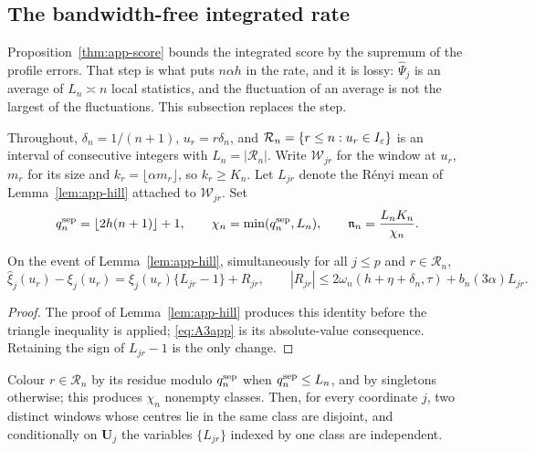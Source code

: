 \subsection{The bandwidth-free integrated rate}\label{app:colour}

Proposition~\ref{thm:app-score} bounds the integrated score by the
supremum of the profile errors.  That step is what puts $n\alpha h$ in
the rate, and it is lossy: $\widehat\Psi_j$ is an average of $L_n\asymp n$
local statistics, and the fluctuation of an average is not the largest
of the fluctuations.  This subsection replaces the step.

Throughout, $\delta_n=1/(n+1)$, $u_r=r\delta_n$, and
$\mathcal R_n=\{r\le n:u_r\in I_\varepsilon\}$ is an interval of consecutive
integers with $L_n=|\mathcal R_n|$.  Write $\mathcal W_{jr}$ for the
window at $u_r$, $m_r$ for its size and $k_r=\lfloor\alpha m_r\rfloor$,
so $k_r\ge K_n$.  Let $L_{jr}$ denote the R\'enyi mean of
Lemma~\ref{lem:app-hill} attached to $\mathcal W_{jr}$.  Set
\begin{equation}
 q_n^{\rm sep}=\lfloor2h(n+1)\rfloor+1,
 \qquad
 \chi_n=\min(q_n^{\rm sep},L_n),
 \qquad
 \mathfrak n_n=\frac{L_nK_n}{\chi_n}.
 \label{eq:effn}
\end{equation}

\begin{lemma}\label{lem:app-signed}
On the event of Lemma~\ref{lem:app-hill}, simultaneously for all $j\le p$
and $r\in\mathcal R_n$,
\[
 \widehat\xi_j(u_r)-\xi_j(u_r)
 =\xi_j(u_r)\{L_{jr}-1\}+R_{jr},
 \qquad
 |R_{jr}|\le2\omega_n(h+\eta+\delta_n,\tau)+b_n(3\alpha)L_{jr}.
\]
\end{lemma}

\begin{proof}
The proof of Lemma~\ref{lem:app-hill} produces this identity before the
triangle inequality is applied; \eqref{eq:A3app} is its absolute-value
consequence.  Retaining the sign of $L_{jr}-1$ is the only change.
\end{proof}

\begin{lemma}\label{lem:app-colour}
Colour $r\in\mathcal R_n$ by its residue modulo $q_n^{\rm sep}$ when
$q_n^{\rm sep}\le L_n$, and by singletons otherwise; this produces
$\chi_n$ nonempty classes.  Then, for every coordinate $j$, two distinct
windows whose centres lie in the same class are disjoint, and
conditionally on $\bm U_j$ the variables $\{L_{jr}\}$ indexed by one
class are independent.
\end{lemma}

